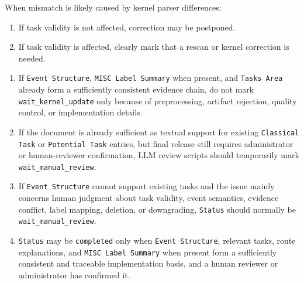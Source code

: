 \begin{tcolorbox}
\smallskip{}\par\smallskip

\noindent When mismatch is likely caused by kernel parser differences:\par\smallskip

\begin{enumerate}[leftmargin=1.5em,noitemsep,topsep=2pt]
\item If task validity is not affected, correction may be postponed.
\item If task validity is affected, clearly mark that a rescan or kernel correction is needed.
\end{enumerate}

\smallskip{}\par\smallskip

\begin{enumerate}[leftmargin=1.5em,noitemsep,topsep=2pt]
\item If \texttt{Event Structure}, \texttt{MISC Label Summary} when present, and \texttt{Tasks Area} already form a sufficiently consistent evidence chain, do not mark \texttt{wait\_kernel\_update} only because of preprocessing, artifact rejection, quality control, or implementation details.
\item If the document is already sufficient as textual support for existing \texttt{Classical Task} or \texttt{Potential Task} entries, but final release still requires administrator or human-reviewer confirmation, LLM review scripts should temporarily mark \texttt{wait\_manual\_review}.
\item If \texttt{Event Structure} cannot support existing tasks and the issue mainly concerns human judgment about task validity, event semantics, evidence conflict, label mapping, deletion, or downgrading, \texttt{Status} should normally be \texttt{wait\_manual\_review}.
\item \texttt{Status} may be \texttt{completed} only when \texttt{Event Structure}, relevant tasks, route explanations, and \texttt{MISC Label Summary} when present form a sufficiently consistent and traceable implementation basis, and a human reviewer or administrator has confirmed it.
\end{enumerate}

\smallskip{}\par\smallskip


\end{tcolorbox}
